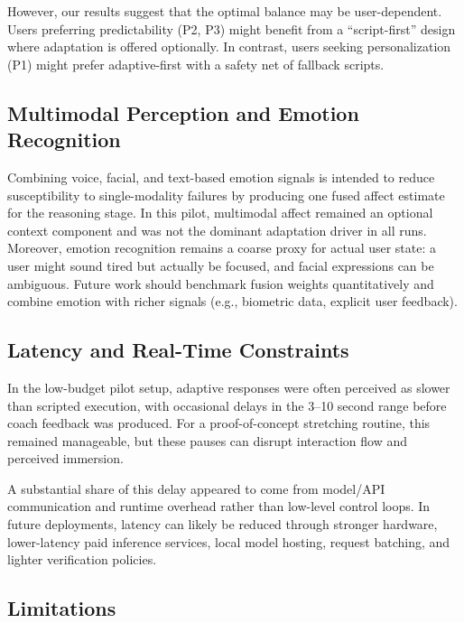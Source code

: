 \documentclass[pdflatex,sn-basic,Numbered,iicol,twocolumn]{sn-jnl}%
\begin{document}
However, our results suggest that the optimal balance may be user-dependent. Users preferring predictability (P2, P3) might benefit from a ``script-first'' design where adaptation is offered optionally. In contrast, users seeking personalization (P1) might prefer adaptive-first with a safety net of fallback scripts.

\subsection{Multimodal Perception and Emotion Recognition}

Combining voice, facial, and text-based emotion signals is intended to reduce susceptibility to single-modality failures by producing one fused affect estimate for the reasoning stage. In this pilot, multimodal affect remained an optional context component and was not the dominant adaptation driver in all runs. Moreover, emotion recognition remains a coarse proxy for actual user state: a user might sound tired but actually be focused, and facial expressions can be ambiguous. Future work should benchmark fusion weights quantitatively and combine emotion with richer signals (e.g., biometric data, explicit user feedback).

\subsection{Latency and Real-Time Constraints}

In the low-budget pilot setup, adaptive responses were often perceived as slower than scripted execution, with occasional delays in the 3--10 second range before coach feedback was produced. For a proof-of-concept stretching routine, this remained manageable, but these pauses can disrupt interaction flow and perceived immersion.

A substantial share of this delay appeared to come from model/API communication and runtime overhead rather than low-level control loops. In future deployments, latency can likely be reduced through stronger hardware, lower-latency paid inference services, local model hosting, request batching, and lighter verification policies.

\subsection{Limitations}
\end{document}
